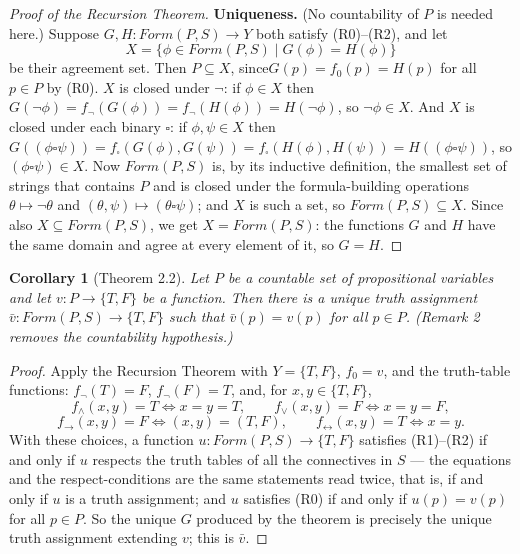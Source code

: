 \documentclass{article}
\newtheorem{corollary}{Corollary}
\theoremstyle{remark}\newtheorem{remark}{Remark}
\begin{document}
\begin{proof}[Proof of the Recursion Theorem]
\textbf{Uniqueness.} (No countability of $P$ is needed here.) Suppose
$G, H \colon Form(P, S) \to Y$ both satisfy (R0)--(R2), and let
\[
X = \{\phi \in Form(P, S) \mid G(\phi) = H(\phi)\}
\]
be their agreement set. Then $P \subseteq X$, since$G(p) = f_0(p) = H(p)$ for all $p \in P$ by (R0). $X$ is closed under $\neg$: if $\phi \in X$ then $G(\neg\phi) = f_{\neg}(G(\phi)) = f_{\neg}(H(\phi)) = H(\neg\phi)$, so $\neg\phi \in X$. And $X$ is closed under each binary $\square$: if $\phi, \psi \in X$ then $G((\phi \square \psi)) = f_{\square}(G(\phi), G(\psi)) = f_{\square}(H(\phi), H(\psi)) = H((\phi \square \psi))$, so $(\phi \square \psi) \in X$. Now $Form(P, S)$ is, by its inductive definition, the smallest set of strings that contains $P$ and is closed under the formula-building operations $\theta \mapsto \neg\theta$ and $(\theta, \psi) \mapsto (\theta \square \psi)$; and $X$ is such a set, so $Form(P, S) \subseteq X$. Since also $X \subseteq Form(P, S)$, we get $X = Form(P, S)$: the functions $G$ and $H$ have the same domain and agree at every element of it, so $G = H$.
\end{proof}

\begin{corollary}[Theorem 2.2]
Let $P$ be a countable set of propositional variables and let $v \colon P \to \{T, F\}$ be a function. Then there is a unique truth assignment $\bar{v} \colon Form(P, S) \to \{T, F\}$ such that $\bar{v}(p) = v(p)$ for all $p \in P$. (Remark 2 removes the countability hypothesis.)
\end{corollary}

\begin{proof}
Apply the Recursion Theorem with $Y = \{T, F\}$, $f_0 = v$, and the truth-table functions: $f_{\neg}(T) = F$, $f_{\neg}(F) = T$, and, for $x, y \in \{T, F\}$,
\[
f_{\land}(x, y) = T \iff x = y = T, \qquad
f_{\lor}(x, y) = F \iff x = y = F,
\]
\[
f_{\rightarrow}(x, y) = F \iff (x, y) = (T, F), \qquad
f_{\leftrightarrow}(x, y) = T \iff x = y.
\]
With these choices, a function $u \colon Form(P, S) \to \{T, F\}$ satisfies (R1)--(R2) if and only if $u$ respects the truth tables of all the connectives in $S$ --- the equations and the respect-conditions are the same statements read twice, that is, if and only if $u$ is a truth assignment; and $u$ satisfies (R0) if and only if $u(p) = v(p)$ for all $p \in P$. So the unique $G$ produced by the theorem is precisely the unique truth assignment extending $v$; this is $\bar{v}$.
\end{proof}
\end{document}
